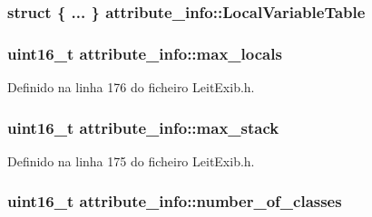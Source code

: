 \hypertarget{structattribute__info_a14fc812933da9d00004f2a85195ec991}{
\subsubsection[{Local\-Variable\-Table}]{\setlength{\rightskip}{0pt plus 5cm}struct \{ ... \}   attribute\-\_\-info\-::\-Local\-Variable\-Table}}\label{structattribute__info_a14fc812933da9d00004f2a85195ec991}
\hypertarget{structattribute__info_aa55aa7b42db88ca316e1bbe038b0dd16}{
\subsubsection[{max\-\_\-locals}]{\setlength{\rightskip}{0pt plus 5cm}uint16\-\_\-t attribute\-\_\-info\-::max\-\_\-locals}}\label{structattribute__info_aa55aa7b42db88ca316e1bbe038b0dd16}


Definido na linha 176 do ficheiro Leit\-Exib.\-h.

\hypertarget{structattribute__info_ab617c25a5e4334c18cea3df9d2505c00}{
\subsubsection[{max\-\_\-stack}]{\setlength{\rightskip}{0pt plus 5cm}uint16\-\_\-t attribute\-\_\-info\-::max\-\_\-stack}}\label{structattribute__info_ab617c25a5e4334c18cea3df9d2505c00}


Definido na linha 175 do ficheiro Leit\-Exib.\-h.

\hypertarget{structattribute__info_acf309770753a9a9e7cf0b91fb4dd45db}{
\subsubsection[{number\-\_\-of\-\_\-classes}]{\setlength{\rightskip}{0pt plus 5cm}uint16\-\_\-t attribute\-\_\-info\-::number\-\_\-of\-\_\-classes}}\label{structattribute__info_acf309770753a9a9e7cf0b91fb4dd45db}


